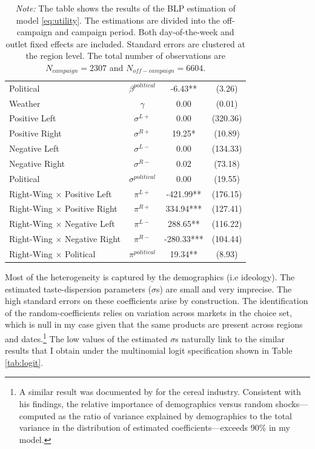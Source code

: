 \documentclass[12pt]{article}
\begin{document}
\begin{table}[!htbp]
\begin{threeparttable}
\begin{tabular}{lccc}
			Political & $\beta^{political}$ & -6.43** & (3.26) \\
			Weather & $\gamma$ & 0.00 & (0.01) \\
			\hline
			Positive Left & $\sigma^{L+}$ & 0.00 & (320.36) \\
			Positive Right & $\sigma^{R+}$ & 19.25* & (10.89) \\
			Negative Left & $\sigma^{L-}$ & 0.00 & (134.33) \\
			Negative Right & $\sigma^{R-}$ & 0.02 & (73.18) \\
			Political & $\sigma^{political}$ & 0.00 & (19.55) \\
			\hline
			Right-Wing $\times$  Positive Left & $\pi^{L+}$ & -421.99** & (176.15) \\
			Right-Wing $\times$  Positive Right & $\pi^{R+}$ & 334.94*** & (127.41) \\
			Right-Wing $\times$  Negative Left & $\pi^{L-}$ & 288.65** & (116.22) \\
			Right-Wing $\times$  Negative Right & $\pi^{R-}$ & -280.33*** & (104.44) \\
			Right-Wing $\times$  Political & $\pi^{political}$ & 19.34** & (8.93) \\
			\hline
			\hline
		\end{tabular}
		
		
		
		
		\caption*{\small \textit{Note:} The table shows the results of the BLP estimation of model \eqref{eq:utility}. The estimations are divided into the off-campaign and campaign period. Both day-of-the-week and outlet fixed effects are included. Standard errors are clustered at the region level. The total number of observations are $N_{campaign}=2307$ and  $N_{off-campaign}=6604$.}
		
	\end{threeparttable}
\end{table}




Most of the heterogeneity is captured by the demographics (i.e ideology).  The estimated taste-dispersion parameters (\(\sigma\)s) are small and very imprecise. The high standard errors on these coefficients arise by construction. The identification of the random-coefficients  relies on variation across markets in the choice set, which is null in my case given that the same products are present across regions and dates.\footnote{A similar result was documented by \citet{Nevo1998MeasuringMP} for the cereal industry. Consistent with his findings, the relative importance of demographics versus random shocks—computed as the ratio of variance explained by demographics to the total variance in the distribution of estimated coefficients—exceeds 90\% in my model.} The low values of the  estimated $\sigma$s naturally link to the similar results that I obtain under the multinomial logit specification shown in Table \ref{tab:logit}. 
 
\end{document}
